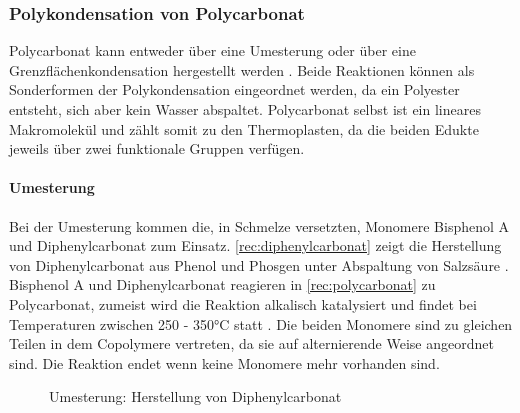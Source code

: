 \subsubsection{Polykondensation von Polycarbonat}

Polycarbonat kann entweder über eine Umesterung oder über eine
Grenzflächenkondensation hergestellt werden \cite{cuzpe}. Beide Reaktionen
können als Sonderformen der Polykondensation eingeordnet werden, da ein
Polyester entsteht, sich aber kein Wasser abspaltet. Polycarbonat selbst ist ein
lineares Makromolekül und zählt somit zu den Thermoplasten, da die beiden Edukte
jeweils über zwei funktionale Gruppen verfügen.

\paragraph{Umesterung}

Bei der Umesterung kommen die, in Schmelze versetzten, Monomere Bisphenol A und
Diphenylcarbonat zum Einsatz. \autoref{rec:diphenylcarbonat} zeigt die
Herstellung von Diphenylcarbonat aus Phenol und Phosgen unter Abspaltung von
Salzsäure \cite{cuzpe}. Bisphenol A und Diphenylcarbonat reagieren in
\autoref{rec:polycarbonat} zu Polycarbonat, zumeist wird die Reaktion alkalisch
katalysiert und findet bei Temperaturen zwischen 250 - 350°C statt \cite{pop}.
Die beiden Monomere sind zu gleichen Teilen in dem Copolymere vertreten, da sie
auf alternierende Weise angeordnet sind. Die Reaktion endet wenn keine Monomere
mehr vorhanden sind.

\begin{figure}[H]
    \begin{center}
        \footnotesize
        \setatomsep{1.7em}

        \chemsign{+}
        \chemrel{->}
        \chemsign{+}

        \caption{Umesterung: Herstellung von Diphenylcarbonat}
        \label{rec:diphenylcarbonat}
    \end{center}
\end{figure}

